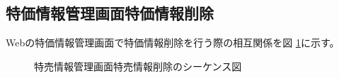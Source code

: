 \documentclass[a4j]{jarticle}
\begin{document}
\subsection{特価情報管理画面特価情報削除}
Webの特価情報管理画面で特価情報削除を行う際の相互関係を図 \ref {tab:oonishi25}に示す。
\begin{figure}[hb]
\begin{center}
\caption{特売情報管理画面特売情報削除のシーケンス図}
\label{tab:oonishi25}
\end{center}
\end{figure}
\end{document}
